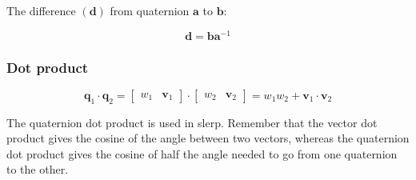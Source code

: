 \documentclass[a4paper,11pt]{article}
\begin{document}
The difference $(\textbf{d})$ from quaternion $\textbf{a}$ to $\textbf{b}$:

$$
\textbf{d}=\textbf{b}\textbf{a}^{-1}
$$

\subsubsection{Dot product}

$$
\textbf{q}_1\cdot\textbf{q}_2=\begin{bmatrix}
	w_1 & \textbf{v}_1
\end{bmatrix}\cdot\begin{bmatrix}
	w_2 & \textbf{v}_2
\end{bmatrix}=
w_1w_2+\textbf{v}_1\cdot\textbf{v}_2
$$

The quaternion dot product is used in slerp. Remember that the vector dot product gives the cosine of the angle between two vectors, whereas the quaternion dot product gives the cosine of half the angle needed to go from one quaternion to the other.
\end{document}
